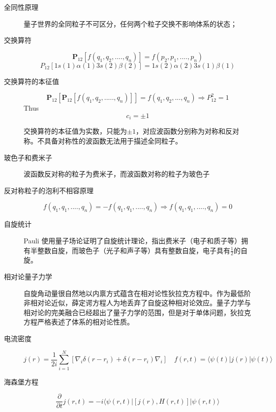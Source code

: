 \documentclass[12pt,a4paper,openany,twoside]{book}
\numberwithin{equation}{section}
\newcommand{\bracketl}[3]{\langle #1 | #2 | #3 \rangle}
\newcommand{\grad}{\nabla}
\begin{document}
  \begin{description}
  	\item[全同性原理] 量子世界的全同粒子不可区分，任何两个粒子交换不影响体系的状态；

  	\item[交换算符]
  	\begin{equation}
  	\textbf{P}_{12}[f(q_1,q_2,....,q_n)]=f(p_2,p_1,....,p_n)
  	\end{equation}
  	\begin{equation}
  	P_{12}[1s(1)\alpha(1)3s(2)\beta(2)]=1s(2)\alpha(2)3s(1)\beta(1)
  	\end{equation}

  	\item[交换算符的本征值]
  	\begin{equation}
  	\textbf{P}_{12}[\textbf{P}_{12}[f(q_1,q_2,.....,q_n)]]=f(q_1,q_2,...,q_n)\Rightarrow P_{12}^2=1
  	\end{equation}
  	Thus
  	\begin{equation}
  	c_i=\pm 1
  	\end{equation}

  	交换算符的本征值为实数，只能为$\pm 1$，对应波函数分别称为对称和反对称。不具备对称性的波函数无法用于描述全同粒子。

  	\item[玻色子和费米子] 波函数反对称的粒子为费米子，而波函数对称的粒子为玻色子

  	\item[反对称粒子的泡利不相容原理]
  	\begin{equation}
  	f(q_1,q_1,....,q_n)=-f(q_1,q_1,....,q_n) \Rightarrow f(q_1,q_1,....,q_n)=0
  	\end{equation}
  	\item[自旋统计] Pauli 使用量子场论证明了自旋统计理论，指出费米子（电子和质子等）拥有半整数自旋，而玻色子（光子和声子等）具有整数自旋，电子具有$\frac{1}{2}$的自旋。

  	\item[相对论量子力学] 自旋角动量很自然地以内禀方式蕴含在相对论性狄拉克方程中。作为最低阶非相对论近似，薛定谔方程人为地丢弃了自旋这种相对论效应。量子力学与相对论的完美融合已经超出了量子力学的范围，但是对于单体问题，狄拉克方程严格表述了体系的相对论性质。
  \end{description}
  


\begin{description}
	\item[电流密度]
	\begin{equation}
	j(r)=\frac{1}{2i}\sum_{i=1}^{N}[\grad_i\delta(r-r_i)+\delta(r-r_i)\grad_i]\quad f(r,t)=\bracketl{\psi(t)}{j(r)}{\psi(t)}\end{equation}


	 \item[海森堡方程]
	 \begin{equation}
	 \frac{\partial}{\partial t}j(r,t)=-i\bracketl{\psi(r,t)}{[j(r),H(r,t)]}{\psi(r,t)}
	 \end{equation}


\end{description}
\end{document}
